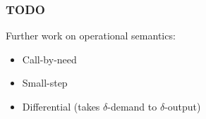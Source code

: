 \begin{frame}
\frametitle{TODO}
Further work on operational semantics:
\begin{itemize}
\item \pause Call-by-need
\item \pause Small-step
\item \pause Differential (takes $\delta$-demand to $\delta$-output)
\end{itemize}
\end{frame}
